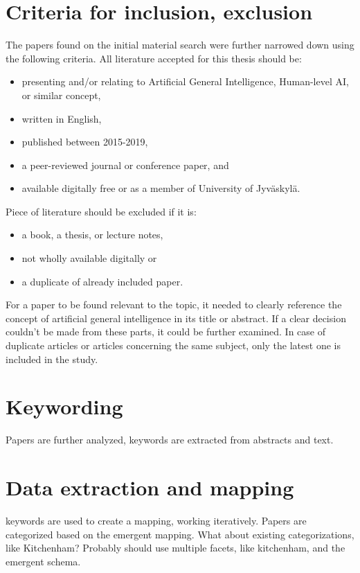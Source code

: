 \documentclass[utf8,english]{gradu3}
\begin{document}
\section{Criteria for inclusion, exclusion}

The papers found on the initial material search were further narrowed down using
the following criteria. All literature accepted for this thesis should be:

\begin{itemize}
  \item presenting and/or relating to Artificial General Intelligence,
  Human-level AI, or similar concept,
  \item written in English,
  \item published between 2015-2019,
  \item a peer-reviewed journal or conference paper, and
  \item available digitally free or as a member of University of Jyväskylä.
\end{itemize}

Piece of literature should be excluded if it is:

\begin{itemize}
  \item a book, a thesis, or lecture notes,
  \item not wholly available digitally or
  \item a duplicate of already included paper.
\end{itemize}

For a paper to be found relevant to the topic, it needed to clearly reference
the concept of artificial general intelligence in its title or abstract. If a
clear decision couldn't be made from these parts, it could be further examined.
In case of duplicate articles or articles concerning the same subject, only the
latest one is included in the study.

\section{Keywording}
Papers are further analyzed, keywords are extracted from abstracts and text. 

\section{Data extraction and mapping}
keywords are used to create a mapping, working iteratively. Papers are
categorized based on the emergent mapping. What about existing categorizations,
like Kitchenham? Probably should use multiple facets, like kitchenham, and the
emergent schema.
\end{document}
